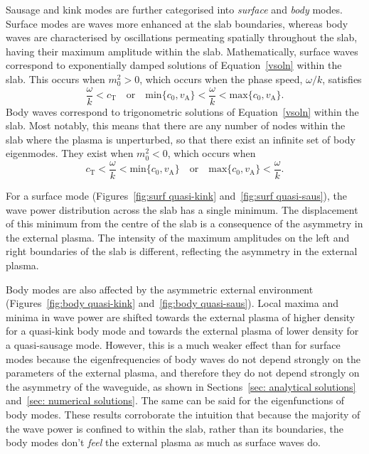 \documentclass[12pt]{../style-files/ociamthesis}
\begin{document}
Sausage and kink modes are further categorised into \textit{surface} and \textit{body} modes. Surface modes are waves more enhanced at the slab boundaries, whereas body waves are characterised by oscillations permeating spatially throughout the slab, having their maximum amplitude within the slab. Mathematically, surface waves correspond to exponentially damped solutions of Equation~\eqref{vsoln} within the slab. This occurs when $m_0^2 > 0$, which occurs when the phase speed, $\omega/k$, satisfies
\begin{equation}
\frac{\omega}{k}<c_\textrm{T} \quad \text{or} \quad \text{min}\{c_0, v_\textrm{A}\}<\frac{\omega}{k}<\text{max}\{c_0, v_\textrm{A}\}.
\end{equation}
Body waves correspond to trigonometric solutions of Equation~\eqref{vsoln} within the slab. Most notably, this means that there are any number of nodes within the slab where the plasma is unperturbed, so that there exist an infinite set of body eigenmodes. They exist when $m_0^2 < 0$, which occurs when
\begin{equation}
c_\textrm{T}<\frac{\omega}{k}<\text{min}\{c_0, v_\textrm{A}\} \quad \text{or} \quad \text{max}\{c_0, v_\textrm{A}\}<\frac{\omega}{k}. \label{bconditions}
\end{equation}

For a surface mode (Figures~\ref{fig:surf quasi-kink} and~\ref{fig:surf quasi-saus}), the wave power distribution across the slab has a single minimum. The displacement of this minimum from the centre of the slab is a consequence of the asymmetry in the external plasma. The intensity of the maximum amplitudes on the left and right boundaries of the slab is different, reflecting the asymmetry in the external plasma.

Body modes are also affected by the asymmetric external environment (Figures~\ref{fig:body quasi-kink} and~\ref{fig:body quasi-saus}). Local maxima and minima in wave power are shifted towards the external plasma of higher density for a quasi-kink body mode and towards the external plasma of lower density for a quasi-sausage mode. However, this is a much weaker effect than for surface modes because the eigenfrequencies of body waves do not depend strongly on the parameters of the external plasma, and therefore they do not depend strongly on the asymmetry of the waveguide, as shown in Sections~\ref{sec: analytical solutions} and~\ref{sec: numerical solutions}. The same can be said for the eigenfunctions of body modes. These results corroborate the intuition that because the majority of the wave power is confined to within the slab, rather than its boundaries, the body modes don't \textit{feel} the external plasma as much as surface waves do.
\end{document}

